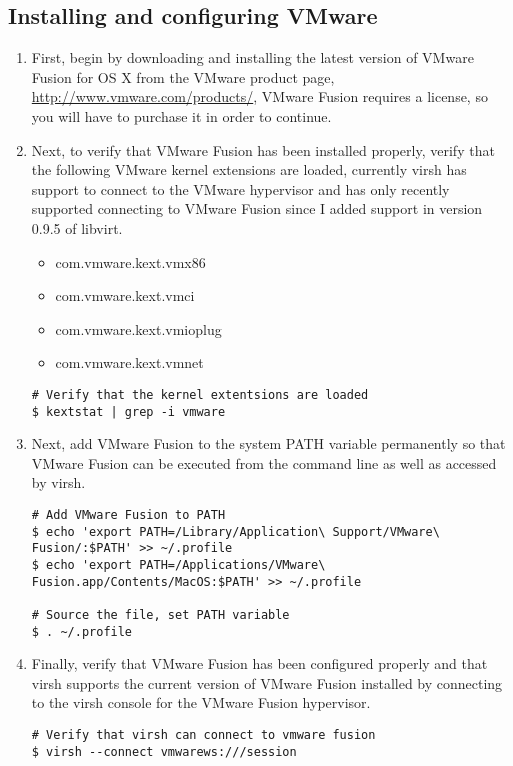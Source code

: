 \subsection{Installing and configuring VMware}
\label{sec:osxvmware}
\begin{enumerate}
\item	First, begin by downloading and installing the latest version of VMware Fusion for OS X from the VMware product 
		page, \url{http://www.vmware.com/products/}, VMware Fusion requires a license, so you will have to purchase it
		in order to continue.
		
\item	Next, to verify that VMware Fusion has been installed properly, verify that the following VMware kernel extensions 
		are loaded, currently virsh has support to connect to the VMware hypervisor and has only recently supported connecting
		to VMware Fusion since I added support in version 0.9.5 of libvirt.
		
\begin{itemize}
\item	com.vmware.kext.vmx86
\item	com.vmware.kext.vmci
\item	com.vmware.kext.vmioplug
\item	com.vmware.kext.vmnet
\end{itemize}

\lstset{language=bash,caption=Verify VMware Kernel Extensions Loaded}
\begin{lstlisting}
# Verify that the kernel extentsions are loaded
$ kextstat | grep -i vmware
\end{lstlisting}

\item	Next, add VMware Fusion to the system PATH variable permanently so that VMware Fusion can be executed from the 
			command line as well as accessed by virsh.

\lstset{language=bash,caption=Add VMware Fusion to PATH}
\begin{lstlisting}
# Add VMware Fusion to PATH
$ echo 'export PATH=/Library/Application\ Support/VMware\ Fusion/:$PATH' >> ~/.profile
$ echo 'export PATH=/Applications/VMware\ Fusion.app/Contents/MacOS:$PATH' >> ~/.profile

# Source the file, set PATH variable
$ . ~/.profile
\end{lstlisting}

\item	Finally, verify that VMware Fusion has been configured properly and that virsh supports the current version of VMware Fusion
            installed by connecting to the virsh console for the VMware Fusion hypervisor.

\lstset{language=bash,caption=Verify VMware Fusion Works with Virsh}
\begin{lstlisting}
# Verify that virsh can connect to vmware fusion
$ virsh --connect vmwarews:///session
\end{lstlisting}
\end{enumerate}





